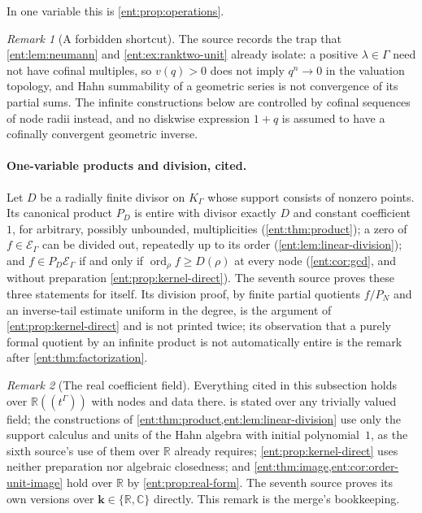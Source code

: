 \documentclass[11pt]{article}
\theoremstyle{plain}
\theoremstyle{plain}
\theoremstyle{plain}
\theoremstyle{definition}
\theoremstyle{definition}
\theoremstyle{definition}
\theoremstyle{definition}
\theoremstyle{remark}
\newtheorem{remark}[remark]{Remark}
\newcommand{\C}{\mathbb C}\newcommand{\R}{\mathbb R}
\newcommand{\K}{K_\Gamma}\newcommand{\KD}{K_\Delta}
\newcommand{\E}{\mathcal E_\Gamma}
\DeclareMathOperator{\ord}{ord}\DeclareMathOperator{\cf}{cf}
\newcommand{\kk}{\mathbf k}\newcommand{\PP}{\mathbb P}
\begin{document}
In one variable this is \cref{ent:prop:operations}.

\begin{remark}[A forbidden shortcut]\label{ent:rc:rem:shortcut}
The source records the trap that \cref{ent:lem:neumann} and
\cref{ent:ex:ranktwo-unit} already isolate: a positive $\lambda\in\Gamma$ need
not have cofinal multiples, so $v(q)>0$ does not imply $q^n\to0$ in the
valuation topology, and Hahn summability of a geometric series is not
convergence of its partial sums. The infinite constructions below are
controlled by cofinal sequences of node radii instead, and no diskwise
expression $1+q$ is assumed to have a cofinally convergent geometric inverse.
\end{remark}

\paragraph{One-variable products and division, cited.}
Let $D$ be a radially finite divisor on $\K$ whose support consists of
nonzero points. Its canonical product $P_D$ is entire with divisor exactly
$D$ and constant coefficient $1$, for arbitrary, possibly unbounded,
multiplicities (\cref{ent:thm:product}); a zero of $f\in\E$ can be divided
out, repeatedly up to its order (\cref{ent:lem:linear-division}); and
$f\in P_D\E$ if and only if $\ord_\rho f\ge D(\rho)$ at every node
(\cref{ent:cor:gcd}, and without preparation \cref{ent:prop:kernel-direct}).
The seventh source proves these three statements for itself. Its division
proof, by finite partial quotients $f/P_N$ and an inverse-tail estimate uniform
in the degree, is the argument of \cref{ent:prop:kernel-direct} and is not
printed twice; its observation that a purely formal quotient by an infinite
product is not automatically entire is the remark after
\cref{ent:thm:factorization}.

\begin{remark}[The real coefficient field]\label{ent:rc:rem:real}
Everything cited in this subsection holds over $\R((t^\Gamma))$ with nodes and
data there.  is stated over any trivially valued
field; the constructions of \cref{ent:thm:product,ent:lem:linear-division}
use only the support calculus and units of the Hahn algebra with initial
polynomial~$1$, as the sixth source's use of them over $\R$ already requires;
\cref{ent:prop:kernel-direct} uses neither preparation nor algebraic
closedness; and \cref{ent:thm:image,ent:cor:order-unit-image} hold over $\R$ by
\cref{ent:prop:real-form}. The seventh source proves its own versions over
$\kk\in\{\R,\C\}$ directly. This remark is the merge's bookkeeping.
\end{remark}
\end{document}

